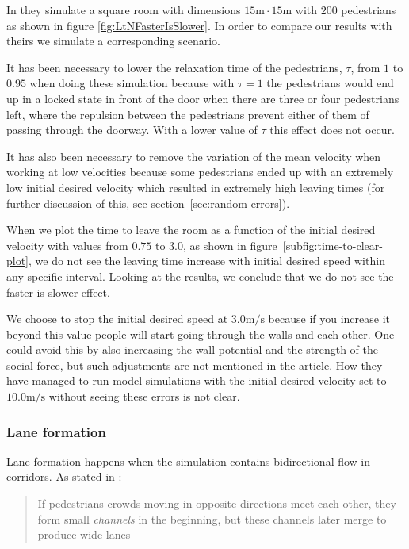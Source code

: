 In \cite{helbing00} they simulate a square room with dimensions 
$15\text{m} \cdot 15\text{m}$ with $200$ pedestrians as shown in 
figure \ref{fig:LtNFasterIsSlower}. In order to compare our results 
with theirs we simulate a corresponding scenario.

It has been necessary to lower the relaxation time of the pedestrians, $\tau$, 
from $1$ to $0.95$ when doing these simulation because with $\tau = 1$ the 
pedestrians would end up in a locked state in front of the door when there are 
three or four pedestrians left, where the repulsion between the pedestrians 
prevent either of them of passing through the doorway. With a lower value of 
$\tau$ this effect does not occur. 

It has also been necessary to remove the variation of the mean velocity when 
working at low velocities because some pedestrians ended up with an extremely 
low initial desired velocity which resulted in extremely high leaving times 
(for further discussion of this, see section~\ref{sec:random-errors}).

When we plot the time to leave the room as a function of the initial desired 
velocity with values from $0.75$ to $3.0$, as shown in 
figure~\ref{subfig:time-to-clear-plot}, we do not see the leaving time 
increase with initial desired speed within any specific interval.  Looking at 
the results, we conclude that we do not see the faster-is-slower effect.

We choose to stop the initial desired speed at $3.0 \text{m}/\text{s}$ because 
if you increase it beyond this value people will start going through the walls 
and each other. One could avoid this by also increasing the wall potential and 
the strength of the social force, but such adjustments are not mentioned in 
the article. How they have managed to run model simulations with the initial 
desired velocity set to $10.0 \text{m}/\text{s}$ without seeing these errors 
is not clear.


\subsubsection{Lane formation}
Lane formation happens when the simulation contains bidirectional flow in 
corridors. As stated in \cite{self-org}:

\begin{quote}
    If pedestrians crowds moving in opposite directions meet each other, they 
    form small \emph{channels} in the beginning, but these channels later 
    merge to produce wide lanes
\end{quote}

